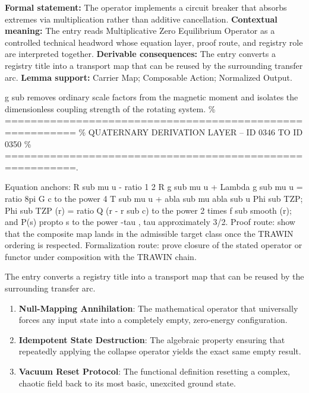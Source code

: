 \begingroup\footnotesize\setlength{\emergencystretch}{3em}\sloppy
\textbf{Formal statement:} The operator implements a circuit breaker that absorbs extremes via multiplication rather than additive cancellation. \textbf{Contextual meaning:} The entry reads Multiplicative Zero Equilibrium Operator as a controlled technical headword whose equation layer, proof route, and registry role are interpreted together. \textbf{Derivable consequences:} The entry converts a registry title into a transport map that can be reused by the surrounding transfer arc. \textbf{Lemma support:} Carrier Map; Composable Action; Normalized Output.\par
\endgroup

g sub removes ordinary scale factors from the magnetic moment and isolates the dimensionless coupling strength of the rotating system. \% ========================================================= \% QUATERNARY DERIVATION LAYER -- ID 0346 TO ID 0350 \% =========================================================.

Equation anchors: R sub mu u - ratio 1 2 R g sub mu u + Lambda g sub mu u = ratio 8pi G c to the power 4 T sub mu u + abla sub mu abla sub u Phi sub TZP; Phi sub TZP (r) = ratio Q (r - r sub c) to the power 2 times f sub smooth (r); and P(s) propto s to the power -tau , tau approximately 3/2. Proof route: show that the composite map lands in the admissible target class once the TRAWIN ordering is respected. Formalization route: prove closure of the stated operator or functor under composition with the TRAWIN chain.

The entry converts a registry title into a transport map that can be reused by the surrounding transfer arc.
\endgroup

\begin{enumerate}[leftmargin=1.6em,itemsep=6pt,topsep=4pt]
\item \textbf{Null-Mapping Annihilation}: The mathematical operator that universally forces any input state into a completely empty, zero-energy configuration.
\item \textbf{Idempotent State Destruction}: The algebraic property ensuring that repeatedly applying the collapse operator yields the exact same empty result.
\item \textbf{Vacuum Reset Protocol}: The functional definition resetting a complex, chaotic field back to its most basic, unexcited ground state.
\end{enumerate}

